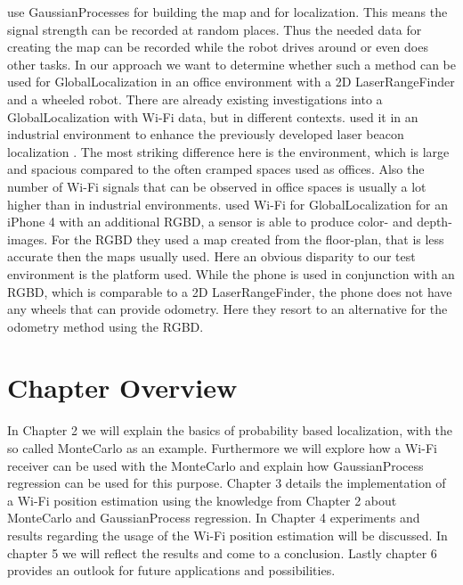 \citet{ferris2006gaussian} use \Gls{GaussianProcess}es for building the map and for localization. This means the signal strength can be recorded at random places. Thus the needed data for creating the map can be recorded while the robot drives around or even does other tasks. 
In our approach we want to determine whether such a method can be used for \gls{GlobalLocalization} in an office environment with a 2D \gls{LaserRangeFinder} and a wheeled robot.
There are already existing investigations into a \gls{GlobalLocalization} with Wi-Fi data, but in different contexts. \citet{duvallet2008wifi} used it in an industrial environment to enhance the previously developed laser beacon localization \citep{4209248}. The most striking difference here is the environment, which is large and spacious compared to the often cramped spaces used as offices. Also the number of Wi-Fi signals that can be observed in office spaces is usually a lot higher than in industrial environments.
\citet{DBLP:conf/icra/ItoEKTSB14} used Wi-Fi for \gls{GlobalLocalization} for an iPhone 4 with an additional \Gls{RGBD}, a sensor is able to produce color- and depth-images. For the \Gls{RGBD} they used a map created from the floor-plan, that is less accurate then the maps usually used. Here an obvious disparity to our test environment is the platform used. While the phone is used in conjunction with an \Gls{RGBD}, which is comparable to a 2D \gls{LaserRangeFinder}, the phone does not have any wheels that can provide odometry. Here they resort to an alternative for the odometry method using the \Gls{RGBD}.  

\section{Chapter Overview}
In Chapter 2 we will explain the basics of probability based localization, with the so called \Gls{MonteCarlo} \citep{Dellaert_1999_533} as an example. 
Furthermore we will explore how a Wi-Fi receiver can be used with the \Gls{MonteCarlo} and explain how \Gls{GaussianProcess} regression \citep{Rasmussen:2005:GPM:1162254} can be used for this purpose.
Chapter 3 details the implementation of a Wi-Fi position estimation using the knowledge from Chapter 2 about \Gls{MonteCarlo} and \Gls{GaussianProcess} regression.
In Chapter 4 experiments and results regarding the usage of the Wi-Fi position estimation will be discussed.
In chapter 5 we will reflect the results and come to a conclusion. 
Lastly chapter 6 provides an outlook for future applications and possibilities.
